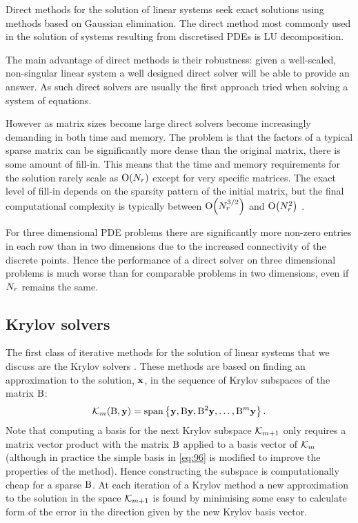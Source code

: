 Direct methods for the solution of linear systems seek exact solutions using methods based on Gaussian elimination.
The direct method most commonly used in the solution of systems resulting from discretised PDEs is LU decomposition.

The main advantage of direct methods is their robustness: given a well-scaled, non-singular linear system a well designed direct solver will be able to provide an answer.
As such direct solvers are usually the first approach tried when solving a system of equations.

However as matrix sizes become large direct solvers become increasingly demanding in both time and memory.
The problem is that the factors of a typical sparse matrix can be significantly more dense than the original matrix, \ie there is some amount of fill-in.
This means that the time and memory requirements for the solution rarely scale as $\mathrm{O}{\left( N_r \right)}$ except for very specific matrices.
The exact level of fill-in depends on the sparsity pattern of the initial matrix, but the final computational complexity is typically between $\mathrm{O}{\left( N_r^{3/2} \right)}$ and $\mathrm{O}{\left( N_r^2 \right)}$ \cite{??ds: need citation for this for corrections, Iserles?}.

For three dimensional PDE problems there are significantly more non-zero entries in each row than in two dimensions due to the increased connectivity of the discrete points.
Hence the performance of a direct solver on three dimensional problems is much worse than for comparable problems in two dimensions, even if $N_r$ remains the same.

\subsection{Krylov solvers}
\label{sec:krylov-solvers}

The first class of iterative methods for the solution of linear systems that we discuss are the Krylov solvers \cite[151]{Saad2000}.
These methods are based on finding an approximation to the solution, $\boldsymbol{\mathrm{x}}$, in the sequence of Krylov subspaces of the matrix $\mathrm{B}$:
\begin{equation}
  \mathcal{K}_m(\mathrm{B}, \boldsymbol{\mathrm{y}}) = \operatorname{span} \left\{ {\boldsymbol{\mathrm{y}}, \mathrm{B} \boldsymbol{\mathrm{y}}, \mathrm{B}^2\boldsymbol{\mathrm{y}}, \ldots, \mathrm{B}^m\boldsymbol{\mathrm{y}}} \right\}.
  \label{eq:96}
\end{equation}
Note that computing a basis for the next Krylov subspace $\mathcal{K}_{m+1}$ only requires a matrix vector product with the matrix $\mathrm{B}$ applied to a basis vector of $\mathcal{K}_m$ (although in practice the simple basis in \cref{eq:96} is modified to improve the properties of the method).
Hence constructing the subspace is computationally cheap for a sparse $\mathrm{B}$.
At each iteration of a Krylov method a new approximation to the solution in the space $\mathcal{K}_{m+1}$ is found by minimising some easy to calculate form of the error in the direction given by the new Krylov basis vector.


